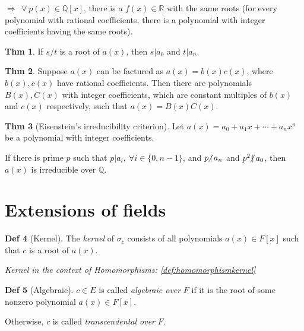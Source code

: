 \documentclass{article}
\theoremstyle{definition}
\newtheorem{definition}{Def}[section]
\newtheorem{theorem}[definition]{Thm}
\newcommand{\ndiv}{\hspace{-4pt}\not|\hspace{2pt}}
\begin{document}
$\Longrightarrow~~\forall~p(x) \in \mathbb{Q}[x]$, there is a $f(x) \in \mathbb{R}$ with the same roots (for every polynomial with rational coefficients, there is a polynomial with integer coefficients having the same roots).

\begin{theorem}
    If $s/t$ is a root of $a(x)$, then $s|a_0$ and $t|a_n$.
\end{theorem}

\begin{theorem}
    Suppose $a(x)$ can be factured as $a(x) = b(x)c(x)$, where $b(x), c(x)$ have rational coefficients. Then there are polynomials $B(x), C(x)$ with integer coefficients, which are constant multiples of $b(x)$ and $c(x)$ respectively, such that $a(x) = B(x)C(x)$.
\end{theorem}

\begin{theorem}[Eisenstein's irreducibility criterion]
    Let $a(x) = a_0 + a_1 x + \cdots + a_n x^n$ be a polynomial with integer coefficients.

    If there is prime $p$ such that $p | a_i, ~\forall i\in\{0, n-1\}$, and $p \ndiv a_n$ and $p^2 \ndiv a_0$, then $a(x)$ is irreducible over $\mathbb{Q}$.
\end{theorem}

\section{Extensions of fields}

\begin{definition}[Kernel]\label{def:extensionkernel}
    The \emph{kernel} of $\sigma_c$ consists of all polynomials $a(x) \in F[x]$ such that $c$ is a root of $a(x)$.

    \emph{Kernel in the context of Homomorphisms: \ref{def:homomorphismkernel}}
\end{definition}

\begin{definition}[Algebraic]
    $c \in E$ is called \emph{algebraic over} $F$ if it is the root of some nonzero polynomial $a(x) \in F[x]$.

    Otherwise, $c$ is called \emph{transcendental over} $F$.
\end{definition}
\end{document}
